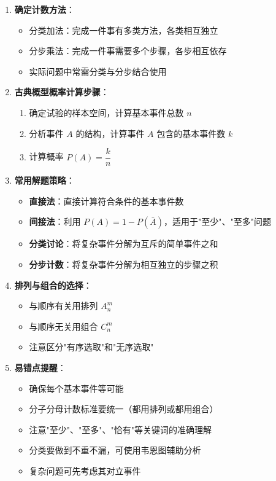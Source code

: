 \documentclass[11pt]{ctexrep}
\begin{document}
\begin{enumerate}
    \item \textbf{确定计数方法}：
    \begin{itemize}
        \item 分类加法：完成一件事有多类方法，各类相互独立
        \item 分步乘法：完成一件事需要多个步骤，各步相互依存
        \item 实际问题中常需分类与分步结合使用
    \end{itemize}
    
    \item \textbf{古典概型概率计算步骤}：
    \begin{enumerate}
        \item 确定试验的样本空间，计算基本事件总数 $n$
        \item 分析事件 $A$ 的结构，计算事件 $A$ 包含的基本事件数 $k$
        \item 计算概率 $P(A) = \dfrac{k}{n}$
    \end{enumerate}
    
    \item \textbf{常用解题策略}：
    \begin{itemize}
        \item \textbf{直接法}：直接计算符合条件的基本事件数
        \item \textbf{间接法}：利用 $P(A) = 1 - P(\bar{A})$，适用于"至少"、"至多"问题
        \item \textbf{分类讨论}：将复杂事件分解为互斥的简单事件之和
        \item \textbf{分步计数}：将复杂事件分解为相互独立的步骤之积
    \end{itemize}
    
    \item \textbf{排列与组合的选择}：
    \begin{itemize}
        \item 与顺序有关用排列 $A_n^m$
        \item 与顺序无关用组合 $C_n^m$
        \item 注意区分"有序选取"和"无序选取"
    \end{itemize}
    
    \item \textbf{易错点提醒}：
    \begin{itemize}
        \item 确保每个基本事件等可能
        \item 分子分母计数标准要统一（都用排列或都用组合）
        \item 注意"至少"、"至多"、"恰有"等关键词的准确理解
        \item 分类要做到不重不漏，可使用韦恩图辅助分析
        \item 复杂问题可先考虑其对立事件
    \end{itemize}
\end{enumerate}
\end{document}
